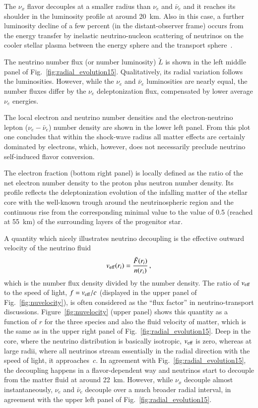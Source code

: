 \documentclass[iop,twocolappendix,numberedappendix]{emulateapj}
\begin{document}
The $\nu_x$ flavor decouples at a smaller radius than $\nu_e$ and $\bar\nu_e$
and it reaches its shoulder in the luminosity profile at around 20~km. Also
in this case, a further luminosity decline of a few percent (in the
distant-observer frame) occurs from the energy transfer by inelastic
neutrino-nucleon scattering of neutrinos on the cooler stellar plasma between
the energy sphere and the transport
sphere~\citep{Raffelt:2001kv,Keil:2002in}.

The neutrino number flux (or number luminosity) $\tilde L$ is shown in the
left middle panel of Fig.~\ref{fig:radial_evolution15}. Qualitatively, its
radial variation follows the luminosities. However, while the $\nu_e$ and
$\bar\nu_e$ luminosities are nearly equal, the number fluxes differ by the
$\nu_e$ deleptonization flux, compensated by lower average $\nu_e$ energies.

The local electron and neutrino number densities and the electron-neutrino lepton
 ($\nu_e-\bar{\nu}_e$) number density  are shown in the lower left panel. From this plot 
 one concludes that within the shock-wave radius all matter effects are certainly dominated 
 by electrons, which, however,
does not necessarily preclude neutrino self-induced flavor conversion.

The electron fraction (bottom right panel) is locally defined as the ratio of
the net electron number density to the proton plus neutron number density.
Its profile reflects the deleptonization evolution of the infalling matter
of the stellar core with the well-known trough around the neutrinospheric
region and the continuous rise from the corresponding minimal value to
the value of 0.5 (reached at 55~km) of the surrounding layers of the progenitor 
star.

A quantity which nicely illustrates neutrino decoupling is the effective
outward velocity of the neutrino fluid
\begin{equation}
\label{eq:nuvelocity}
v_{\rm eff}(r_i)=\frac{\tilde{F}(r_i)}{n(r_i)}\,,
\end{equation}
which is the number flux density divided by the number density. The ratio
of $v_{\rm eff}$ to the speed of light, $f = v_{\rm eff}/c$ (displayed in
the upper panel of Fig.~\ref{fig:nuvelocity}), is often considered as the
``flux factor'' in neutrino-transport discussions.
Figure~\ref{fig:nuvelocity} (upper panel) shows this quantity as a function
of $r$ for the three species and also the fluid velocity of matter, which is
the same as in the upper right panel of Fig.~\ref{fig:radial_evolution15}.
Deep in the core, where the neutrino distribution is basically isotropic,
$v_{\rm eff}$ is zero, whereas at large radii, where all neutrinos stream
essentially in the radial direction with the speed of light, it
approaches~$c$. In agreement with Fig.~\ref{fig:radial_evolution15}, the
decoupling happens in a flavor-dependent way and neutrinos start to decouple
from the matter fluid at around 22~km. However, while $\nu_x$ decouple almost
instantaneously, $\nu_e$ and $\bar\nu_e$ decouple over a much broader radial
interval, in agreement with the upper left panel of
Fig.~\ref{fig:radial_evolution15}.
\end{document}
